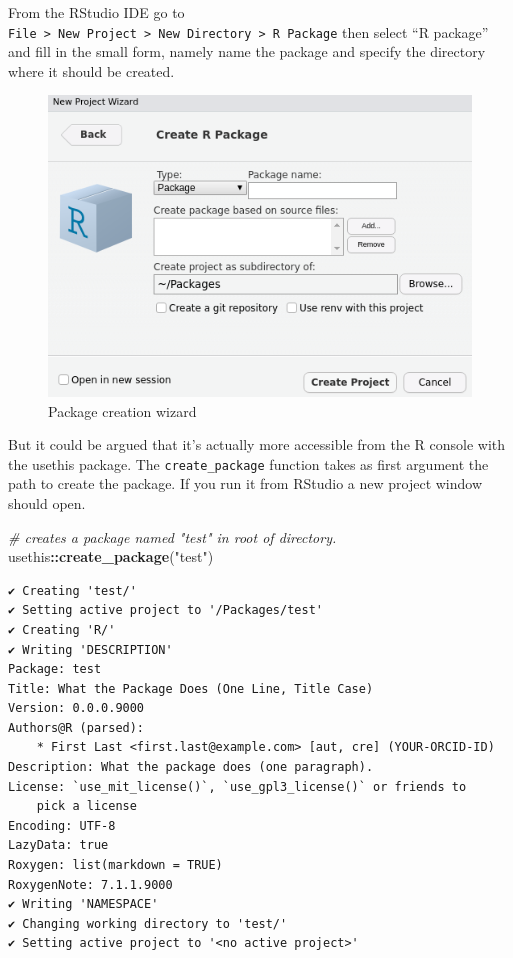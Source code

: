 \documentclass[
]{krantz}
\makeatletter
\newenvironment{Shaded}{\begin{snugshade}}{\end{snugshade}}
\newcommand{\CommentTok}[1]{\textcolor[rgb]{0.37,0.37,0.37}{\textit{#1}}}
\newcommand{\KeywordTok}[1]{\textcolor[rgb]{0.27,0.27,0.27}{\textbf{#1}}}
\newcommand{\NormalTok}[1]{#1}
\newcommand{\OperatorTok}[1]{\textcolor[rgb]{0.43,0.43,0.43}{\textbf{#1}}}
\newcommand{\StringTok}[1]{\textcolor[rgb]{0.5,0.5,0.5}{#1}}
\newenvironment{kframe}{%
\medskip{}
\setlength{\fboxsep}{.8em}
 \def\at@end@of@kframe{}%
 \ifinner\ifhmode%
  \def\at@end@of@kframe{\end{minipage}}%
  \begin{minipage}{\columnwidth}%
 \fi\fi%
 \def\FrameCommand##1{\hskip\@totalleftmargin \hskip-\fboxsep
 \colorbox{shadecolor}{##1}\hskip-\fboxsep
     \hskip-\linewidth \hskip-\@totalleftmargin \hskip\columnwidth}%
 \MakeFramed {\advance\hsize-\width
   \@totalleftmargin\z@ \linewidth\hsize
   \@setminipage}}%
 {\par\unskip\endMakeFramed%
 \at@end@of@kframe}
\renewenvironment{Shaded}{\begin{kframe}}{\end{kframe}}
\makeatother
\begin{document}
From the RStudio IDE go to \texttt{File\ \textgreater{}\ New\ Project\ \textgreater{}\ New\ Directory\ \textgreater{}\ R\ Package} then select ``R package'' and fill in the small form, namely name the package and specify the directory where it should be created.

\begin{figure}[t]

{\centering \includegraphics[width=1\linewidth]{images/rstudio-create-package} 

}

\caption{Package creation wizard}\label{fig:rstudio-create-package}
\end{figure}

But it could be argued that it's actually more accessible from the R console with the usethis package. The \texttt{create\_package} function takes as first argument the path to create the package. If you run it from RStudio a new project window should open.

\begin{Shaded}
\begin{Highlighting}[]
\CommentTok{\# creates a package named "test" in root of directory.}
\NormalTok{usethis}\OperatorTok{::}\KeywordTok{create\_package}\NormalTok{(}\StringTok{"test"}\NormalTok{)}
\end{Highlighting}
\end{Shaded}

\begin{verbatim}
✔ Creating 'test/'
✔ Setting active project to '/Packages/test'
✔ Creating 'R/'
✔ Writing 'DESCRIPTION'
Package: test
Title: What the Package Does (One Line, Title Case)
Version: 0.0.0.9000
Authors@R (parsed):
    * First Last <first.last@example.com> [aut, cre] (YOUR-ORCID-ID)
Description: What the package does (one paragraph).
License: `use_mit_license()`, `use_gpl3_license()` or friends to
    pick a license
Encoding: UTF-8
LazyData: true
Roxygen: list(markdown = TRUE)
RoxygenNote: 7.1.1.9000
✔ Writing 'NAMESPACE'
✔ Changing working directory to 'test/'
✔ Setting active project to '<no active project>'
\end{verbatim}
\end{document}

